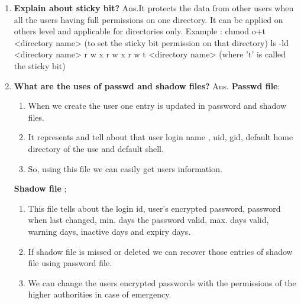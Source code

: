 \begin{enumerate}
    \bigskip
    \bigskip

    \item\textbf{Explain about sticky bit?}
    \newline
    Ans.It protects the data from other users when all the users having full permissions on one directory.
    \newline
    It can be applied on others level and applicable for directories only.
    Example :  chmod    o+t    <directory name>	(to set the sticky bit permission on that directory)
            \newline
             ls   -ld	<directory name> 	   r w x r w x r w t	<directory name>	(where   't'  is called the sticky bit)


    \bigskip
    \bigskip

    \item \textbf{What are the uses of passwd and shadow files?}
    \newline
    Ans. \textbf {Passwd file}:
           \begin{enumerate}
             \item When we create the user one entry is updated in password and shadow files.
             \item It represents and tell about that user login name , uid, gid, default home directory of the use and default shell. 
             \item So, using this file we can easily get users information.
           \end{enumerate}
        \textbf{Shadow file };
          \begin{enumerate}
             \item This file tells about the login id, user's encrypted password,  password when last changed,  min. days the password valid, max. days valid, warning days, inactive days and expiry days.
             \item If shadow file is missed or deleted we can recover those entries of shadow file using password file.
             \item We can change the users encrypted passwords with the permissions of the higher authorities in case of 	emergency.
          \end{enumerate}  
    
    \bigskip
    \bigskip


\end{enumerate}
